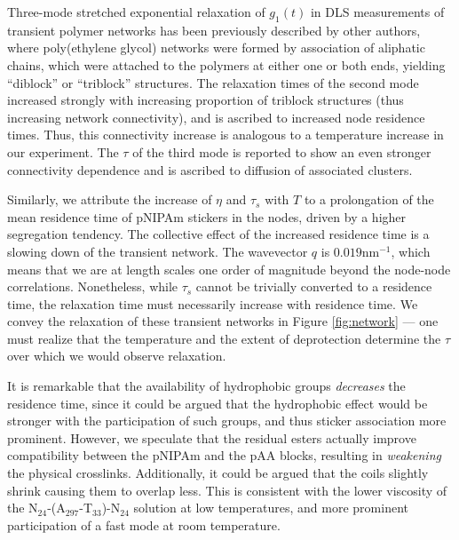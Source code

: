 \documentclass{article}
\begin{document}
Three-mode stretched exponential relaxation of $g_1(t)$ in DLS measurements of transient polymer
networks has been previously described by other authors, \cite{Bohdan2016, Thuresson1999}
where poly(ethylene glycol) networks were formed by association of aliphatic chains, which 
were attached to the polymers at either one or both ends, yielding ``diblock'' or ``triblock'' 
structures. The relaxation 
times of the second mode increased strongly with increasing proportion of 
triblock structures (thus increasing network connectivity), and is ascribed to increased 
node residence times. Thus, this connectivity increase is analogous to a temperature 
increase in our experiment.
The $\tau$ of the third mode is reported to show an even stronger connectivity dependence
\cite{Bohdan2016} and is ascribed to diffusion of associated clusters. 


Similarly, we attribute the increase of $\eta$ and $\tau_s$ with $T$ 
to a prolongation of the mean residence time of pNIPAm stickers in the nodes, 
driven by a higher segregation tendency. The collective effect of the increased 
residence time is a slowing down of the transient network. The wavevector $q$ is 
$0.019\mathrm{nm}^{-1}$, which means that we 
are at length scales one order of magnitude beyond the node-node correlations.
Nonetheless, while $\tau_s$ cannot be trivially converted to a residence time,
the relaxation time must necessarily increase with residence time.\cite{Bohdan2016} 
We convey the relaxation of these transient networks in Figure 
\ref{fig:network} --- one must realize that the temperature and the extent of 
deprotection determine the $\tau$ over which we would observe relaxation.


It is remarkable that the availability of hydrophobic groups \emph{decreases} the residence time, 
since it could be argued that the hydrophobic effect would be stronger with the participation of such groups, 
and thus sticker association more prominent. However, we speculate that the residual esters 
actually improve compatibility between the pNIPAm and the pAA blocks, 
resulting in \emph{weakening} the physical crosslinks. Additionally, it could 
be argued that the coils slightly shrink causing them to overlap less. This is 
consistent with the lower viscosity of the N$_\mathrm{24}$-(A$_\mathrm{297}$-T$_\mathrm{33}$)-N$_\mathrm{24}$
solution at low temperatures, and more prominent participation of a fast mode at room temperature.
\end{document}
